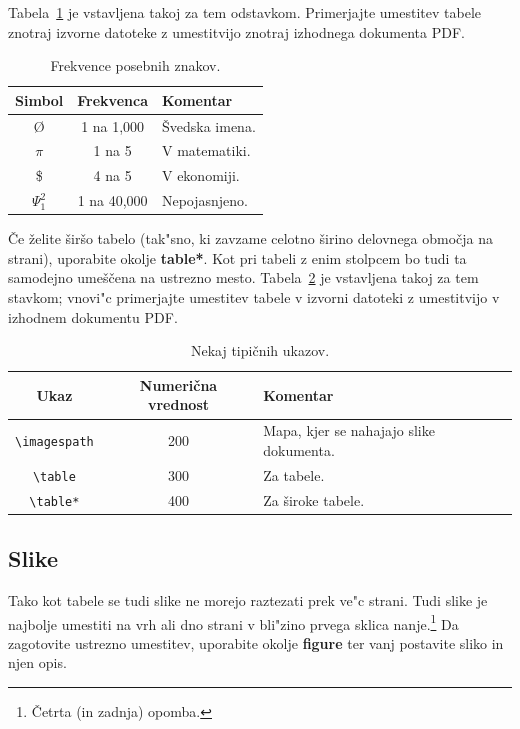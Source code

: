 \documentclass[sigconf,nonacm]{acmart}
\begin{document}
Tabela~\ref{tab:table1} je vstavljena takoj za tem odstavkom.  Primerjajte
umestitev tabele znotraj izvorne datoteke z umestitvijo znotraj izhodnega
dokumenta PDF\@.

\begin{table}
    \centering
    \caption{Frekvence posebnih znakov.}
    \label{tab:table1}
    \begin{tabular}{ccl}
        \toprule
        Simbol&Frekvenca&Komentar\\
        \midrule
        \O & 1 na 1,000& Švedska imena.\\
        $\pi$ & 1 na 5& V matematiki.\\
        \$ & 4 na 5 & V ekonomiji.\\
        $\Psi^2_1$ & 1 na 40,000& Nepojasnjeno. \\
        \bottomrule
    \end{tabular}
\end{table}

Če želite širšo tabelo (tak"sno, ki zavzame celotno širino delovnega območja
na strani), uporabite okolje \textbf{table*}.  Kot pri tabeli z enim stolpcem
bo tudi ta samodejno umeščena na ustrezno mesto.  Tabela~\ref{tab:table2} je
vstavljena takoj za tem stavkom; vnovi"c primerjajte umestitev tabele v
izvorni datoteki z umestitvijo v izhodnem dokumentu PDF\@.

\begin{table}
    \centering
    \caption{Nekaj tipičnih ukazov.}
    \label{tab:table2}
    \begin{tabular}{ccl}
        \toprule
        Ukaz&Numerična vrednost&Komentar\\
        \midrule
        \texttt{\textbackslash{}imagespath} & 200 & Mapa, kjer se nahajajo slike dokumenta. \\
        \texttt{\textbackslash{}table} & 300 & Za tabele.\\
        \texttt{\textbackslash{}table*} & 400& Za široke tabele.\\
        \bottomrule
    \end{tabular}
\end{table}

\subsection{Slike}

Tako kot tabele se tudi slike ne morejo raztezati prek ve"c strani. Tudi slike
je najbolje umestiti na vrh ali dno strani v bli"zino prvega sklica
nanje.\footnote{Četrta (in zadnja) opomba.}  Da zagotovite ustrezno umestitev,
uporabite okolje \textbf{figure} ter vanj postavite sliko in njen opis.
\end{document}
